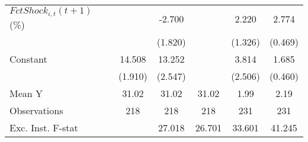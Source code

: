 {\begin{tabular}{l*{5}{c}}
\addlinespace
$ FctShock_{i,t}(t+1)$ (\%)&                     &      -2.700         &                     &       2.220         &       2.774\sym{***}\\
                    &                     &     (1.820)         &                     &     (1.326)         &     (0.469)         \\
\addlinespace
Constant            &      14.508\sym{***}&      13.252\sym{***}&                     &       3.814         &       1.685\sym{***}\\
                    &     (1.910)         &     (2.547)         &                     &     (2.506)         &     (0.460)         \\
\midrule
Mean Y              &       31.02         &       31.02         &       31.02         &        1.99         &        2.19         \\
Observations        &         218         &         218         &         218         &         231         &         231         \\
Exc. Inst. F-stat   &                     &      27.018         &      26.701         &      33.601         &      41.245         \\
\bottomrule
\end{tabular}
}
